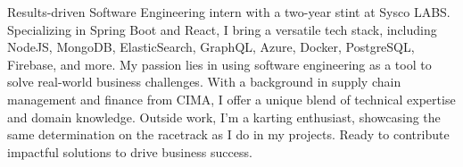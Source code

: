 \begin{cvparagraph}

    Results-driven Software Engineering intern with a two-year stint at Sysco LABS. Specializing in Spring Boot and React, I bring a versatile tech stack, including NodeJS, MongoDB, ElasticSearch, GraphQL, Azure, Docker, PostgreSQL, Firebase, and more. My passion lies in using software engineering as a tool to solve real-world business challenges. With a background in supply chain management and finance from CIMA, I offer a unique blend of technical expertise and domain knowledge. Outside work, I'm a karting enthusiast, showcasing the same determination on the racetrack as I do in my projects. Ready to contribute impactful solutions to drive business success.

\end{cvparagraph}